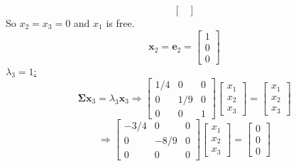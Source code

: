 \begin{enumerate}[font=\bfseries]
\begin{enumerate}
\[\begin{bmatrix}
                \end{bmatrix}
            \]
            So $x_2 = x_3 = 0$ and $x_1$ is free.
            \[
                \mathbf{x}_2
                =
                \mathbf{e}_2
                =
                \begin{bmatrix}
                    1 \\
                    0 \\
                    0
                \end{bmatrix}
            \]
            \underline{$\lambda_3 = 1$:}
            \[
                \mathbf{\Sigma}\mathbf{x}_3 = \lambda_3\mathbf{x}_3
                \Rightarrow
                \begin{bmatrix}
                    1/4 & 0 & 0\\
                    0 & 1/9 & 0\\
                    0 & 0 & 1
                \end{bmatrix}
                \begin{bmatrix}
                    x_1 \\
                    x_2 \\
                    x_3
                \end{bmatrix}
                =
                \begin{bmatrix}
                    x_1 \\
                    x_2 \\
                    x_3
                \end{bmatrix}
            \]
            \[
                \Rightarrow
                \begin{bmatrix}
                    -3/4 & 0 & 0\\
                    0 & -8/9 & 0\\
                    0 & 0 & 0
                \end{bmatrix}
                \begin{bmatrix}
                    x_1 \\
                    x_2 \\
                    x_3
                \end{bmatrix}
                =
                \begin{bmatrix}
                    0 \\
                    0 \\
                    0
                \end{bmatrix}
\]
\end{enumerate}
\end{enumerate}
